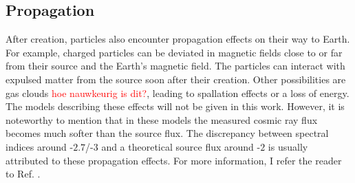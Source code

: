 \subsection{Propagation}
\label{subsec:propagation}
After creation, particles also encounter propagation effects on their way to Earth. For example, charged particles can be deviated in magnetic fields close to or far from their source and the Earth's magnetic field. The particles can interact with expulsed matter from the source soon after their creation. Other possibilities are gas clouds \textcolor{red}{hoe nauwkeurig is dit?}, leading to spallation effects or a loss of energy. The models describing these effects will not be given in this work. However, it is noteworthy to mention that in these models the measured cosmic ray flux becomes much softer than the source flux. The discrepancy between spectral indices around -$2.7$/-$3$ and a theoretical source flux around -$2$ is usually attributed to these propagation effects. For more information, I refer the reader to Ref. \cite{Gaisser:2016uoy}.


